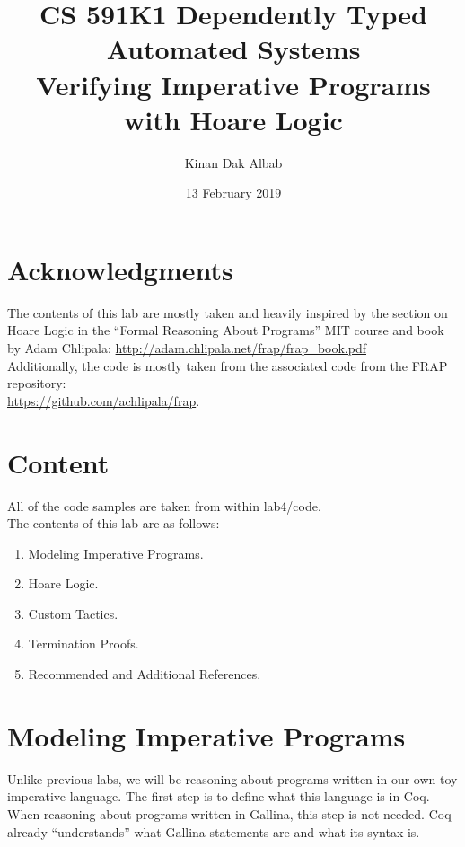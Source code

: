 \documentclass{article}
\title{CS 591K1 Dependently Typed Automated Systems\\
Verifying Imperative Programs with Hoare Logic}
\author{Kinan Dak Albab}
\date{13 February 2019}
\begin{document}
\maketitle

\section*{Acknowledgments}
The contents of this lab are mostly taken and heavily inspired by the section on Hoare Logic in the ``Formal Reasoning About Programs'' MIT course and book by Adam Chlipala: \href{http://adam.chlipala.net/frap/frap\_book.pdf}{http://adam.chlipala.net/frap/frap\_book.pdf}\\
Additionally, the code is mostly taken from the associated code from the FRAP repository: \\ \href{https://github.com/achlipala/frap}{https://github.com/achlipala/frap}.

\section {Content}
All of the code samples are taken from within lab4/code. \\
The contents of this lab are as follows:
\begin{enumerate}
    \item Modeling Imperative Programs.
    \item Hoare Logic.
    \item Custom Tactics.
    \item Termination Proofs.
    \item Recommended and Additional References.
\end{enumerate}

\section{Modeling Imperative Programs}
Unlike previous labs, we will be reasoning about programs written in our own toy imperative language. The first step is to define what this language is in Coq. When reasoning about programs written in Gallina, this step is not needed. Coq already ``understands'' what Gallina statements are and what its syntax is. \\
\end{document}
